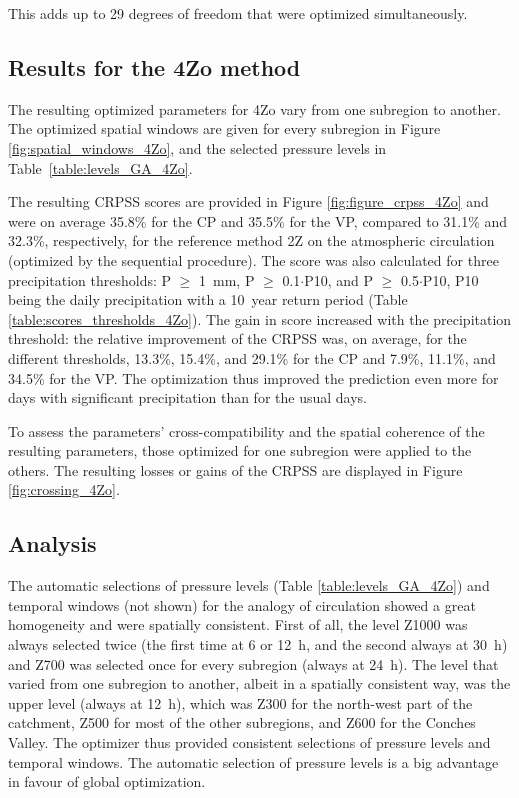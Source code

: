 \documentclass[review]{elsarticle}
\begin{document}
This adds up to 29 degrees of freedom that were optimized simultaneously.


\subsection{Results for the 4Zo method}

The resulting optimized parameters for 4Zo vary from one subregion to another. The optimized spatial windows are given for every subregion in Figure \ref{fig:spatial_windows_4Zo}, and the selected pressure levels in Table~\ref{table:levels_GA_4Zo}. 

The resulting CRPSS scores are provided in Figure \ref{fig:figure_crpss_4Zo} and were on average 35.8\% for the CP and 35.5\% for the VP, compared to 31.1\% and 32.3\%, respectively, for the reference method 2Z on the atmospheric circulation (optimized by the sequential procedure). The score was also calculated for three precipitation thresholds: P \(\geq\) 1~mm, P \(\geq\) 0.1\(\cdot\)P10, and P \(\geq\) 0.5\(\cdot\)P10, P10 being the daily precipitation with a 10~year return period (Table \ref{table:scores_thresholds_4Zo}). The gain in score increased with the precipitation threshold: the relative improvement of the CRPSS was, on average, for the different thresholds, 13.3\%, 15.4\%, and 29.1\% for the CP and 7.9\%, 11.1\%, and 34.5\% for the VP. The optimization thus improved the prediction even more for days with significant precipitation than for the usual days.

To assess the parameters’ cross-compatibility and the spatial coherence of the resulting parameters, those optimized for one subregion were applied to the others. The resulting losses or gains of the CRPSS are displayed in Figure \ref{fig:crossing_4Zo}.


\subsection{Analysis}

The automatic selections of pressure levels (Table \ref{table:levels_GA_4Zo}) and temporal windows (not shown) for the analogy of circulation showed a great homogeneity and were spatially consistent. First of all, the level Z1000 was always selected twice (the first time at 6 or 12~h, and the second always at 30~h) and Z700 was selected once for every subregion (always at 24~h). The level that varied from one subregion to another, albeit in a spatially consistent way, was the upper level (always at 12~h), which was Z300 for the north-west part of the catchment, Z500 for most of the other subregions, and Z600 for the Conches Valley. The optimizer thus provided consistent selections of pressure levels and temporal windows. The automatic selection of pressure levels is a big advantage in favour of global optimization.
\end{document}
